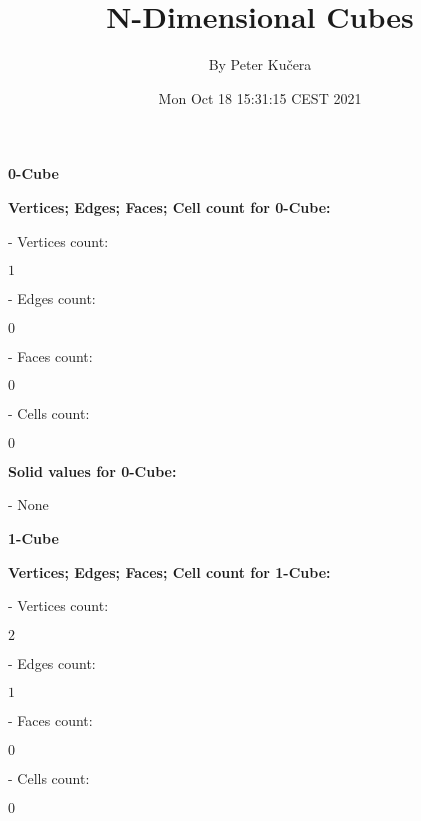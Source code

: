 \documentclass[a4paper,10pt]{article}
\begin{document}
\title{\Large{\textbf{N-Dimensional Cubes}}}
\author{By Peter Kučera}
\date{Mon Oct 18 15:31:15 CEST 2021}
\maketitle
\newpage
\centerline{\Large{\textbf{0-Cube}}}
\bigskip
\large{\textbf{Vertices; Edges; Faces; Cell count for 0-Cube:}}
\begin{multicols}{2}
- Vertices count:
\columnbreak
\begin{flushright}
$1$
\end{flushright}
\end{multicols}
\begin{multicols}{2}
- Edges count:
\columnbreak
\begin{flushright}
$0$
\end{flushright}
\end{multicols}
\begin{multicols}{2}
- Faces count:
\columnbreak
\begin{flushright}
$0$
\end{flushright}
\end{multicols}
\begin{multicols}{2}
- Cells count:
\columnbreak
\begin{flushright}
$0$
\end{flushright}
\end{multicols}
\large{\textbf{Solid values for 0-Cube:}}
\begin{multicols}{2}
- None
\end{multicols}
\newpage
\centerline{\Large{\textbf{1-Cube}}}
\bigskip
\large{\textbf{Vertices; Edges; Faces; Cell count for 1-Cube:}}
\begin{multicols}{2}
- Vertices count:
\columnbreak
\begin{flushright}
$2$
\end{flushright}
\end{multicols}
\begin{multicols}{2}
- Edges count:
\columnbreak
\begin{flushright}
$1$
\end{flushright}
\end{multicols}
\begin{multicols}{2}
- Faces count:
\columnbreak
\begin{flushright}
$0$
\end{flushright}
\end{multicols}
\begin{multicols}{2}
- Cells count:
\columnbreak
\begin{flushright}
$0$
\end{flushright}
\end{multicols}
\end{document}
